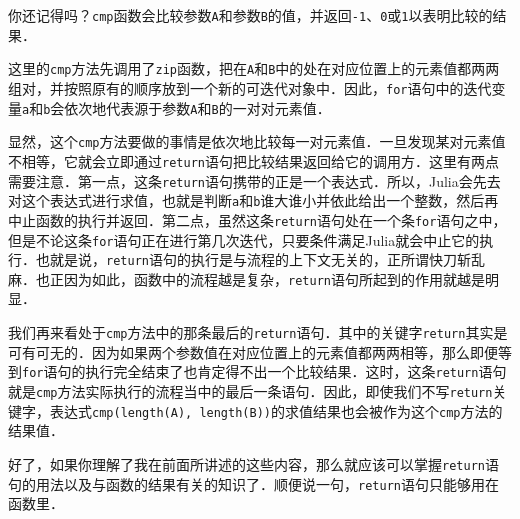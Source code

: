 你还记得吗？\verb|cmp|函数会比较参数\verb|A|和参数\verb|B|的值，并返回\verb|-1|、\verb|0|或\verb|1|以表明比较的结果．

这里的\verb|cmp|方法先调用了\verb|zip|函数，把在\verb|A|和\verb|B|中的处在对应位置上的元素值都两两组对，并按照原有的顺序放到一个新的可迭代对象中．因此，\verb|for|语句中的迭代变量\verb|a|和\verb|b|会依次地代表源于参数\verb|A|和\verb|B|的一对对元素值．

显然，这个\verb|cmp|方法要做的事情是依次地比较每一对元素值．一旦发现某对元素值不相等，它就会立即通过\verb|return|语句把比较结果返回给它的调用方．这里有两点需要注意．第一点，这条\verb|return|语句携带的正是一个表达式．所以，Julia会先去对这个表达式进行求值，也就是判断\verb|a|和\verb|b|谁大谁小并依此给出一个整数，然后再中止函数的执行并返回．第二点，虽然这条\verb|return|语句处在一个条\verb|for|语句之中，但是不论这条\verb|for|语句正在进行第几次迭代，只要条件满足Julia就会中止它的执行．也就是说，\verb|return|语句的执行是与流程的上下文无关的，正所谓快刀斩乱麻．也正因为如此，函数中的流程越是复杂，\verb|return|语句所起到的作用就越是明显．

我们再来看处于\verb|cmp|方法中的那条最后的\verb|return|语句．其中的关键字\verb|return|其实是可有可无的．因为如果两个参数值在对应位置上的元素值都两两相等，那么即便等到\verb|for|语句的执行完全结束了也肯定得不出一个比较结果．这时，这条\verb|return|语句就是\verb|cmp|方法实际执行的流程当中的最后一条语句．因此，即使我们不写\verb|return|关键字，表达式\verb|cmp(length(A), length(B))|的求值结果也会被作为这个\verb|cmp|方法的结果值．

好了，如果你理解了我在前面所讲述的这些内容，那么就应该可以掌握\verb|return|语句的用法以及与函数的结果有关的知识了．顺便说一句，\verb|return|语句只能够用在函数里．